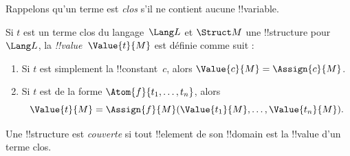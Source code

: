 \documentclass[../../../include/open-logic-section]{subfiles}
\begin{document}


\begin{explain}
Rappelons qu'un terme est \emph{clos} s'il ne contient aucune
!!{variable}.
\end{explain}

\begin{defn}
Si $t$ est un terme clos du langage~$\Lang L$ et $\Struct M$ une
!!{structure} pour~$\Lang L$, la \emph{!!{value}}~$\Value{t}{M}$
est définie comme suit :
\begin{enumerate}
\item Si $t$ est simplement la !!{constant}~$c$, alors
  $\Value{c}{M} = \Assign{c}{M}$.
\item Si $t$ est de la forme $\Atom{f}{t_1, \ldots, t_n}$, alors
  \[
  \Value{t}{M} = \Assign{f}{M}(\Value{t_1}{M}, \ldots,
  \Value{t_n}{M}).
  \]
\end{enumerate}
\end{defn}

\begin{defn}
Une !!{structure} est \emph{couverte} si tout !!{element} de son
!!{domain} est la !!{value} d'un terme clos.
\end{defn}
\end{document}
